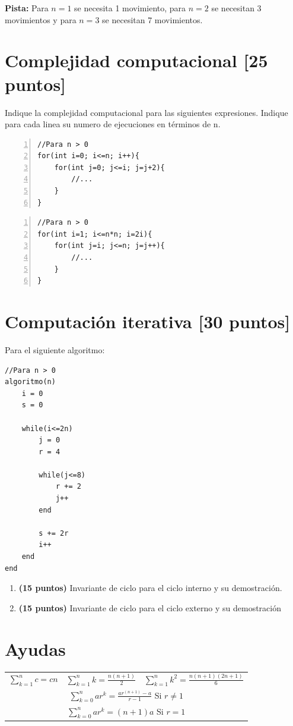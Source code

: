 \documentclass[9pt,twocolumn]{article}
\begin{document}
\textbf{Pista:} Para $n=1$ se necesita 1 movimiento, para $n=2$ se necesitan 3 movimientos y para $n=3$ se necesitan 7 movimientos.
\newpage
\section{Complejidad computacional \small{[25 puntos]}} 

Indique la complejidad computacional para las siguientes expresiones. Indique para cada linea su numero de ejecuciones en términos de n.

\begin{lstlisting}[numbers=left]
//Para n > 0
for(int i=0; i<=n; i++){
	for(int j=0; j<=i; j=j+2){
		//...	
	}
}
\end{lstlisting} 
	
\begin{lstlisting}[numbers=left]
//Para n > 0
for(int i=1; i<=n*n; i=2i){
	for(int j=i; j<=n; j=j++){
		//...	
	}
}
\end{lstlisting} 
\section{Computación iterativa \small{[30 puntos]}} 

Para el siguiente algoritmo:

\begin{lstlisting}
//Para n > 0
algoritmo(n)
	i = 0
	s = 0
	
	while(i<=2n)
		j = 0
		r = 4
		
		while(j<=8)
			r += 2
			j++
		end		
		
		s += 2r
		i++
	end
end
\end{lstlisting} 

\begin{enumerate}
	\item \textbf{\textbf{(15 puntos)}} Invariante de ciclo para el ciclo interno y su demostración.
	\item \textbf{\textbf{(15 puntos)}} Invariante de ciclo para el ciclo externo y su demostración
\end{enumerate}

\section*{Ayudas}
\begin{tabular}{ccc}
 $\sum \limits_{k=1}^n c = cn$ & $\sum \limits_{k=1}^n k = \frac{n(n+1)}{2}$ & $\sum \limits_{k=1}^n k^2 = \frac{n(n+1)(2n+1)}{6}$ \\
  \multicolumn{3}{c}{$\sum \limits_{k=0}^n ar^k = \frac{ar^{(n+1)}-a}{r-1}$ Si $r \neq 1$ } \\
 \multicolumn{3}{c}{$\sum \limits_{k=0}^n ar^k = (n+1)a$ Si $r = 1$ } 
\end{tabular}
\end{document}
